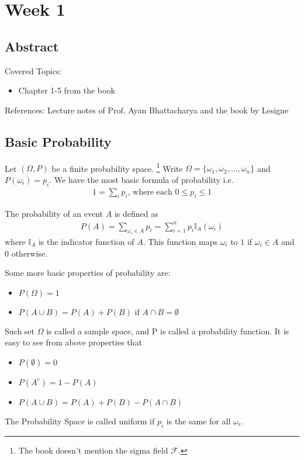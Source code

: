 
\chapter{Week 1}
\label{chap:Week1}
\section*{Abstract}
Covered Topics:
    \begin{itemize}
        \item Chapter 1-5 from the book
    \end{itemize}
    References: Lecture notes of Prof. Ayan Bhattacharya \cite{Notes2024} and the book by Lesigne \cite{lesigne2005heads}
\section{Basic Probability}
Let $(\Omega,P)$ be a finite probability space. \footnote{The book doesn't mention the sigma field $\mathscr{F}$.} 
Write $\Omega=\{\omega_1,\omega_2,\ldots,\omega_n\}$ and $P(\omega_i)=p_i$. We have the most basic formula of probability i.e. 
\begin{align}
    1=\sum_i{p_i} \text{, where each } 0 \leq p_i \leq 1
\end{align}
\begin{definition}
    The probability of an event $A$ is defined as 
    \begin{align}
        P(A)=\sum_{\omega_i \in A}{p_i}=\sum_{i=1}^{n}{p_i \mathbb{I}_A(\omega_i)}
    \end{align}
    where $\mathbb{I}_A$ is the indicator function of $A$. This function maps $\omega_i$ to $1$ if $\omega_i \in A$ and $0$ otherwise.
\end{definition}
Some more basic properties of probability are:
\begin{itemize}
    \item $P(\Omega)=1$
    \item $P(A \cup B)=P(A)+P(B) \text{ if } A \cap B=\emptyset$
\end{itemize}
Such set $\Omega$ is called a sample space, and P is called a probability function. It is easy to see from above properties that
\begin{itemize}
    \item $P(\emptyset)=0$
    \item $P(A^c)=1-P(A)$
    \item $P(A \cup B)=P(A)+P(B)-P(A \cap B)$
\end{itemize}
\begin{definition}
    The Probability Space is called uniform if $p_i$ is the same for all $\omega_i$.
\end{definition}
